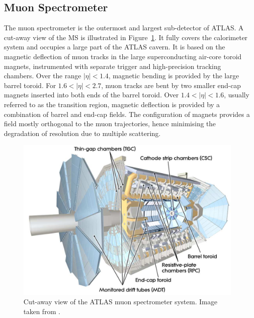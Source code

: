 \subsection{Muon Spectrometer}
\label{sec:MS}
The muon spectrometer is the outermost and largest sub-detector of ATLAS. 
A cut-away view of the MS is illustrated in Figure~\ref{fig:MS}.
It fully covers the	calorimeter system and occupies a large part of the ATLAS cavern. 
It is based on the magnetic deflection of muon tracks in the 
large superconducting air-core toroid magnets, instrumented with
separate trigger and high-precision tracking chambers. 
Over the range $|\eta|< 1.4$, magnetic bending is provided by the large 
barrel toroid. For $1.6 < |\eta|< 2.7$, muon tracks are bent by two smaller
end-cap magnets inserted into both ends of the barrel toroid. 
Over $1.4 < |\eta|< 1.6$, usually referred to as the transition region, 
magnetic deflection is provided by a combination of barrel and end-cap
fields. The configuration of magnets provides a field mostly orthogonal 
to the muon trajectories, hence minimising the degradation of 
resolution due to multiple scattering. 
\begin{figure}[bht]
	\begin{centering}	
	\includegraphics[width=.9\textwidth]{Detector_plots/Muon.png}
	\caption{Cut-away view of the ATLAS muon spectrometer system. Image taken from \cite{PERF-2007-01}.}
	\label{fig:MS}
	\end{centering}
\end{figure}

